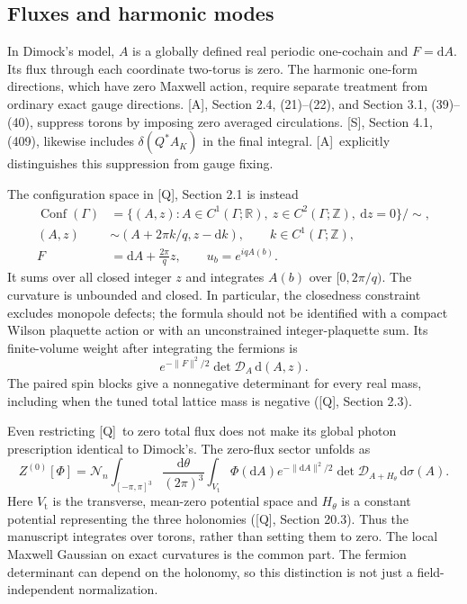 \documentclass[11pt]{article}
\numberwithin{equation}{section}
\newcommand{\R}{\mathbb R}
\newcommand{\Z}{\mathbb Z}
\newcommand{\dd}{\mathrm d}
\newcommand{\Q}{\textup{[Q]}}
\newcommand{\AG}{\textup{[A]}}
\newcommand{\US}{\textup{[S]}}
\begin{document}
\subsection{Fluxes and harmonic modes}

In Dimock's model, $A$ is a globally defined real periodic one-cochain
and $F=\dd A$. Its flux through each coordinate two-torus is zero.
The harmonic one-form directions, which have zero Maxwell action,
require separate treatment from ordinary exact gauge directions.
\AG, Section 2.4, (21)--(22), and Section 3.1, (39)--(40), suppress
torons by imposing zero averaged circulations. \US, Section 4.1,
(409), likewise includes $\delta(Q^*A_K)$ in the final integral.
\AG\ explicitly distinguishes this suppression from gauge fixing.

The configuration space in \Q, Section 2.1 is instead
\begin{align}
 \operatorname{Conf}(\Gamma)
 &=\{(A,z):A\in C^1(\Gamma;\R),\ z\in C^2(\Gamma;\Z),\ \dd z=0\}/\sim,
 \\
 (A,z)&\sim(A+2\pi k/q,z-\dd k),\qquad k\in C^1(\Gamma;\Z),\\
 F&=\dd A+\frac{2\pi}{q}z,\qquad u_b=e^{iqA(b)}.
 \label{eq:digest-flux-model}
\end{align}
It sums over all closed integer $z$ and integrates $A(b)$ over
$[0,2\pi/q)$. The curvature is unbounded and closed. In particular,
the closedness constraint excludes monopole defects; the formula
should not be identified with a compact Wilson plaquette action or
with an unconstrained integer-plaquette sum.
Its finite-volume weight after integrating the fermions is
\begin{equation}
 e^{-\|F\|^2/2}\det\mathcal D_A\,\dd(A,z).
\end{equation}
The paired spin blocks give a nonnegative determinant for every real
mass, including when the tuned total lattice mass is negative
(\Q, Section 2.3).

Even restricting \Q\ to zero total flux does not make its global
photon prescription identical to Dimock's. The zero-flux sector
unfolds as
\begin{equation}
 Z^{(0)}[\Phi]
 =\mathcal N_n\int_{[-\pi,\pi]^3}\frac{\dd\theta}{(2\pi)^3}
  \int_{V_{\mathrm t}}\Phi(\dd A)e^{-\|\dd A\|^2/2}
        \det\mathcal D_{A+H_\theta}\,\dd\sigma(A).
 \label{eq:digest-unfold}
\end{equation}
Here $V_{\mathrm t}$ is the transverse, mean-zero potential space and
$H_\theta$ is a constant potential representing the three holonomies
(\Q, Section 20.3). Thus the manuscript integrates over torons, rather
than setting them to zero. The local Maxwell Gaussian on exact
curvatures is the common part. The fermion determinant can depend on
the holonomy, so this distinction is not just a field-independent
normalization.
\end{document}
